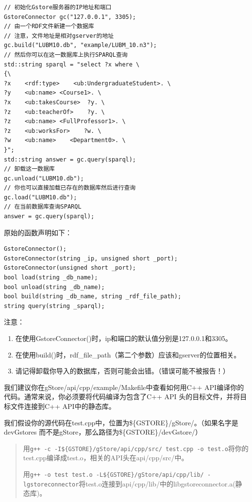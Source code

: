 \documentclass[titlepage, a4paper, 12pt]{article}
\begin{document}
\begin{verbatim}
// 初始化Gstore服务器的IP地址和端口
GstoreConnector gc("127.0.0.1", 3305);
// 由一个RDF文件新建一个数据库
// 注意，文件地址是相对gserver的地址
gc.build("LUBM10.db", "example/LUBM_10.n3");
// 然后你可以在这一数据库上执行SPARQL查询
std::string sparql = "select ?x where \
{\
?x    <rdf:type>    <ub:UndergraduateStudent>. \
?y    <ub:name> <Course1>. \
?x    <ub:takesCourse>  ?y. \
?z    <ub:teacherOf>    ?y. \
?z    <ub:name> <FullProfessor1>. \
?z    <ub:worksFor>    ?w. \
?w    <ub:name>    <Department0>. \
}";
std::string answer = gc.query(sparql);
// 卸载这一数据库
gc.unload("LUBM10.db");
// 你也可以直接加载已存在的数据库然后进行查询
gc.load("LUBM10.db");
// 在当前数据库查询SPARQL
answer = gc.query(sparql);
\end{verbatim}

原始的函数声明如下：

\begin{verbatim}
GstoreConnector();
GstoreConnector(string _ip, unsigned short _port);
GstoreConnector(unsigned short _port);
bool load(string _db_name);
bool unload(string _db_name);
bool build(string _db_name, string _rdf_file_path);
string query(string _sparql);
\end{verbatim}

注意：

\begin{enumerate}
	\item
	在使用GstoreConnector()时，ip和端口的默认值分别是127.0.0.1和3305。
	\item
	在使用build()时，rdf\_file\_path（第二个参数）应该和gserver的位置相关。
	\item
	请记得卸载你导入的数据库，否则可能会出错。（错误可能不被报告！）
\end{enumerate}


我们建议你在gStore/api/cpp/example/Makefile中查看如何用C++ API编译你的代码。通常来说，你必须要将代码编译为包含了C++ API 头的目标文件，并将目标文件连接到C++ API中的静态库。

我们假设你的源代码在test.cpp中，位置为\$\{GSTORE\}/gStore/。（如果名字是devGstores 而不是gStore，那么路径为\$\{GSTORE\}/devGstore/）

\begin{quote}
	用\texttt{g++\ -c\ -I\$\{GSTORE\}/gStore/api/cpp/src/\ test.cpp\ -o\ test.o}将你的test.cpp编译成test.o，相关的API头在api/cpp/src/中。
	
	用\texttt{g++\ -o\ test\ test.o\ -L\$\{GSTORE\}/gStore/api/cpp/lib/\ -lgstoreconnector}将test.o连接到api/cpp/lib/中的libgstoreconnector.a(静态库)。
\end{quote}
\end{document}
